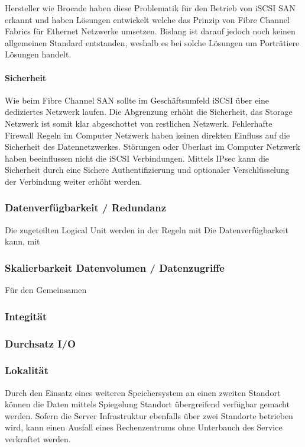 Hersteller wie Brocade haben diese Problematik für den Betrieb von iSCSI SAN erkannt und haben Lösungen entwickelt welche das Prinzip von Fibre Channel Fabrics für Ethernet Netzwerke umsetzen. Bislang ist darauf jedoch noch keinen allgemeinen Standard entstanden, weshalb es bei solche Lösungen um Porträtiere Lösungen handelt.

\paragraph*{Sicherheit}
Wie beim Fibre Channel SAN sollte im Geschäftsumfeld iSCSI über eine dediziertes Netzwerk laufen. Die Abgrenzung erhöht die Sicherheit, das Storage Netzwerk ist somit klar abgeschottet von restlichen Netzwerk. Fehlerhafte Firewall Regeln im Computer Netzwerk haben keinen direkten Einfluss auf die Sicherheit des Datennetzwerkes. Störungen oder Überlast im Computer Netzwerk haben beeinflussen nicht die iSCSI Verbindungen. Mittels IPsec kann die Sicherheit durch eine Sichere Authentifizierung und optionaler Verschlüsselung der Verbindung weiter erhöht werden. 

\subsubsection{Datenverfügbarkeit / Redundanz}
Die zugeteilten Logical Unit werden in der Regeln mit
Die Datenverfügbarkeit kann, mit 

\subsubsection{Skalierbarkeit Datenvolumen / Datenzugriffe}
Für den Gemeinsamen 

\subsubsection{Integität}


\subsubsection{Durchsatz I/O}

\subsubsection{Lokalität}
Durch den Einsatz eines weiteren Speichersystem an einen zweiten Standort können die Daten mittels Spiegelung Standort übergreifend verfügbar gemacht werden. Sofern die Server Infrastruktur ebenfalls über zwei Standorte betrieben wird, kann einen Ausfall eines Rechenzentrums ohne Unterbauch des Service verkraftet werden.

